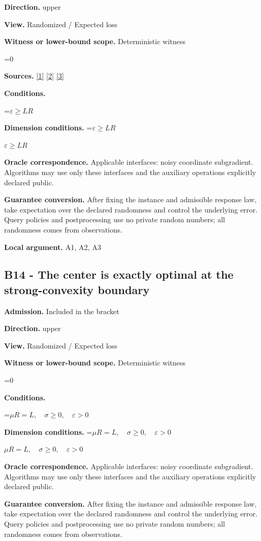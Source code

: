 \documentclass[10pt,a4paper]{article}
\newcommand{\AtlasMath}[1]{\par\begingroup\centering\setbox0=\hbox{$\displaystyle #1$}\ifdim\wd0>1.4\linewidth\typeout{ATLAS WIDE FORMULA: \the\wd0}\fi\ifdim\wd0>\linewidth\resizebox{\linewidth}{!}{\box0}\else\box0\fi\par\endgroup}
\newcommand{\AtlasInlineMath}[1]{\begingroup\setbox0=\hbox{$#1$}\ifdim\wd0>.4\linewidth\endgroup\AtlasMath{#1}\else\endgroup$#1$\fi}
\begin{document}
\textbf{Direction.} upper

\textbf{View.} Randomized / Expected loss

\textbf{Witness or lower-bound scope.} Deterministic witness

\AtlasMath{0}
\textbf{Sources.} \href{https://arxiv.org/pdf/1405.4980}{[1]} \href{https://www2.isye.gatech.edu/~nemirovs/MOR_AccuracyCertificates.pdf}{[2]} \href{https://arxiv.org/pdf/2609.20701}{[3]}

\textbf{Conditions.} 
\AtlasMath{\varepsilon\ge LR}


\textbf{Dimension conditions.} \AtlasInlineMath{\varepsilon\ge LR}

\textbf{Oracle correspondence.} Applicable interfaces: noisy coordinate subgradient. Algorithms may use only these interfaces and the auxiliary operations explicitly declared public.

\textbf{Guarantee conversion.} After fixing the instance and admissible response law, take expectation over the declared randomness and control the underlying error. Query policies and postprocessing use no private random numbers; all randomness comes from observations.

\textbf{Local argument.} A1, A2, A3

\subsection{B14 - The center is exactly optimal at the strong-convexity boundary}
\textbf{Admission.} Included in the bracket

\textbf{Direction.} upper

\textbf{View.} Randomized / Expected loss

\textbf{Witness or lower-bound scope.} Deterministic witness

\AtlasMath{0}
\textbf{Conditions.} 
\AtlasMath{\mu R=L,\quad\sigma\ge0,\quad\varepsilon>0}


\textbf{Dimension conditions.} \AtlasInlineMath{\mu R=L,\quad\sigma\ge0,\quad\varepsilon>0}

\textbf{Oracle correspondence.} Applicable interfaces: noisy coordinate subgradient. Algorithms may use only these interfaces and the auxiliary operations explicitly declared public.

\textbf{Guarantee conversion.} After fixing the instance and admissible response law, take expectation over the declared randomness and control the underlying error. Query policies and postprocessing use no private random numbers; all randomness comes from observations.
\end{document}
